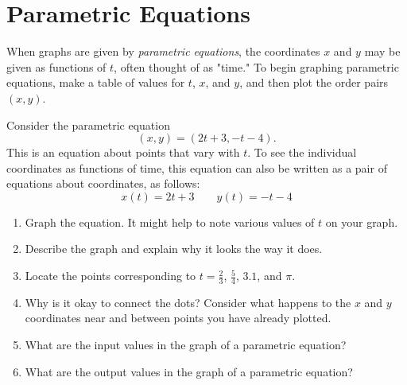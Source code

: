 
\newpage

\section{Parametric Equations}


%

When graphs are given by \emph{parametric equations}, the coordinates $x$ and $y$ may be given as functions of $t$, often thought of as "time."  To begin graphing parametric equations, make a table of values for $t$, $x$, and $y$, and then plot the order pairs $(x, y)$.  

\begin{prob}
 Consider the parametric equation $$(x,y) = (2t+3,-t-4).$$  This is an equation about points that vary with $t$.  To see the individual coordinates as functions of time, this equation can also be written as a pair of equations about coordinates, as follows:  
\begin{equation}
x(t) = 2t + 3  \qquad y(t) = -t-4
\end{equation}
\begin{enumerate}
\item Graph the equation.  It might help to note various values of $t$ on your graph. 
\item Describe the graph and explain why it looks the way it does.  
\item Locate the points corresponding to $t=\frac{2}{3}$, $\frac{5}{4}$, $3.1$, and $\pi$.  
\item Why is it okay to connect the dots?  Consider what happens to the $x$ and $y$ coordinates near and between points you have already plotted.  
\item What are the input values in the graph of a parametric equation?  
\item What are the output values in the graph of a parametric equation?  
\end{enumerate}

\end{prob}

